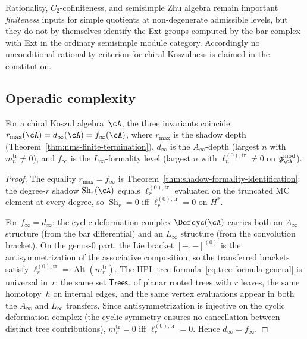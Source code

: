 Rationality, $C_2$-cofiniteness, and semisimple Zhu algebra remain
important \emph{finiteness} inputs for simple quotients at
non-degenerate admissible levels, but they do not by themselves
identify the Ext groups computed by the bar complex with Ext in the
ordinary semisimple module category. Accordingly no unconditional
rationality criterion for chiral Koszulness is claimed in the
constitution.

\subsection{Operadic complexity}
\label{subsec:concordance-operadic-complexity}

\begin{theorem}
\label{thm:operadic-complexity-concordance}%
For a chiral Koszul algebra~$\cA$, the three invariants
coincide: $r_{\max}(\cA) = d_\infty(\cA) = f_\infty(\cA)$,
where $r_{\max}$ is the shadow depth
(Theorem~\ref{thm:nms-finite-termination}), $d_\infty$ is
the $A_\infty$-depth (largest $n$ with $m_n^{\mathrm{tr}}
\neq 0$), and $f_\infty$ is the $L_\infty$-formality level
(largest $n$ with $\ell_n^{(0),\mathrm{tr}} \neq 0$ on
$\mathfrak{g}_\cA^{\mathrm{mod}}$).
\end{theorem}

\begin{proof}
The equality $r_{\max} = f_\infty$ is
Theorem~\ref{thm:shadow-formality-identification}:
the degree-$r$ shadow $\operatorname{Sh}_r(\cA)$ equals
$\ell_r^{(0),\mathrm{tr}}$ evaluated on the truncated
MC element at every degree, so $\operatorname{Sh}_r = 0$
iff $\ell_r^{(0),\mathrm{tr}} = 0$ on $H^*$.

For $f_\infty = d_\infty$: the cyclic deformation complex
$\Defcyc(\cA)$ carries both an $A_\infty$ structure
(from the bar differential) and an $L_\infty$ structure
(from the convolution bracket). On the genus-$0$ part,
the Lie bracket $[-,-]^{(0)}$ is the antisymmetrization
of the associative composition, so the transferred
brackets satisfy
$\ell_r^{(0),\mathrm{tr}} =
\operatorname{Alt}(m_r^{\mathrm{tr}})$.
The HPL tree formula~\eqref{eq:tree-formula-general}
is universal in~$r$: the same set $\mathsf{Trees}_r$
of planar rooted trees with $r$ leaves, the same
homotopy~$h$ on internal edges, and the same vertex
evaluations appear in both the $A_\infty$ and
$L_\infty$ transfers. Since antisymmetrization is
injective on the cyclic deformation complex
(the cyclic symmetry ensures no cancellation between
distinct tree contributions), $m_r^{\mathrm{tr}} = 0$
iff $\ell_r^{(0),\mathrm{tr}} = 0$. Hence
$d_\infty = f_\infty$.
\end{proof}

